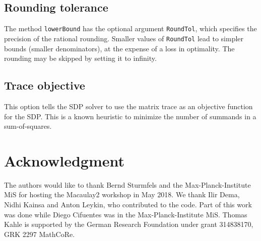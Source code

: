 \documentclass[11pt]{amsart}
\theoremstyle{plain}%
\theoremstyle{definition}
\theoremstyle{remark}
\newcommand{\Mac}{Macaulay2\xspace}
\begin{document}
\subsection*{Rounding tolerance}
The method \verb|lowerBound| has the optional argument \verb|RoundTol|, which specifies the precision of the rational rounding.
Smaller values of \verb|RoundTol| lead to simpler bounds (smaller denominators), at the expense of a loss in optimality.
The rounding may be skipped by setting it to infinity.

\subsection*{Trace objective}
This option tells the SDP solver to use the matrix trace as an objective function for the SDP.
This is a known heuristic to minimize the number of summands in a sum-of-squares.


\section*{Acknowledgment}
\label{sec:acknowledgement}
The authors would like to thank Bernd Sturmfels and the Max-Planck-Institute MiS for hosting the \Mac workshop in May 2018.
We thank Ilir Dema, Nidhi Kainsa and Anton Leykin, who contributed to the code.
Part of this work was done while Diego Cifuentes was in the Max-Planck-Institute MiS.
Thomas Kahle is supported by the German Research Foundation under grant 314838170, GRK 2297 MathCoRe.



\end{document}
